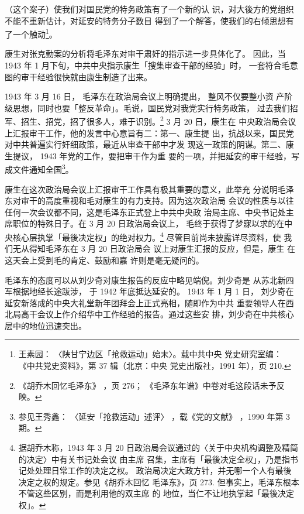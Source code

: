 （这个案子）使我们对国民党的特务政策有了一个新的认 识，对大後方的党组织
不能不重新估计，对延安的特务分子数目 得到了一个解答，使我们的右倾思想有
了一个触动\footnote{王素园： 〈陕甘宁边区「抢救运动」始末〉。载中共中央
党史研究室编： 《中共党史资料》，第 37 辑（北京：中央 党史出版社，1991
年），页 210.  }。

康生对张克勤案的分析将毛泽东对审干肃奸的指示进一步具体化了。
因此，当 1943 年 1 月下旬，中共中央指示康生「搜集审查干部的经验」时，
一套符合毛意图的审干经验很快就由康生制造了出来。

1943 年 3 月 16 日，
毛泽东在政治局会议上明确提出，
整风不仅要整小资
产阶级思想，同时也要「整反革命」。毛说，国民党对我党实行特务政策，
过去我们招军、招生、招党，招了很多人，难于识别。\footnote{《胡乔木回忆毛泽东》
，页 276；
《毛泽东年谱》中卷对毛这段话未予反映。} 3 月 20 日，康生在
中央政治局会议上汇报审干工作，他的发言中心意旨有二：第一、康生提
出，抗战以来，国民党对中共普遍实行奸细政策，最近从审查干部中才发
现这一政策的阴谋。第二、康生提议， 1943 年党的工作，要把审干作为重
要的一项，并把延安的审干经验，写成文件通知全国\footnote{参见王秀鑫：
〈延安「抢救运动」述评〉
，载《党的文献》
，1990 年第 3 期。}。

康生在这次政治局会议上汇报审干工作具有极其重要的意义，此举充 分说明毛泽
东对审干的高度重视和毛对康生的有力支持。因为这次政治局 会议的性质与以往
任何一次会议都不同，这是毛泽东正式登上中共中央政 治局主席、中央书记处主
席职位的特殊日子。在 3 月 20 日政治局会议上， 毛终于获得了梦寐以求的在中
央核心层执掌「最後决定权」的绝对权力。\footnote{据胡乔木称，1943 年 3
月 20 日政治局会议通过的〈关于中央机构调整及精简的决定〉中有关书记处会议
由主席 召集，主席有「最後决定全权」，乃是指书记处处理日常工作的决定之权。
政治局决定大政方针，并无哪一个人有最後 决定之权的规定。参见《胡乔木回忆
毛泽东》，页 273. 但事实上，毛泽东根本不管这些区别，而是利用他的双主席
的 地位，当仁不让地执掌起「最後决定权」。} 尽管目前尚未披露详尽资料，使
我们无从得知毛泽东在 3 月 20 日政治局会 议上对康生汇报的反应，但是，康生
在这天会上受到毛的肯定、鼓励和嘉 许则是毫无疑问的。

毛泽东的态度可以从刘少奇对康生报告的反应中略见端倪。刘少奇是
从苏北新四军根据地经长途跋涉，
于 1942 年底抵达延安的。
1943 年 1 月 1 日，
刘少奇在延安新落成的中央大礼堂新年团拜会上正式亮相，随即作为中共
重要领导人在西北局高干会议上作介绍华中工作经验的报告。通过这些安
排，刘少奇在中共核心层中的地位迅速突出。


